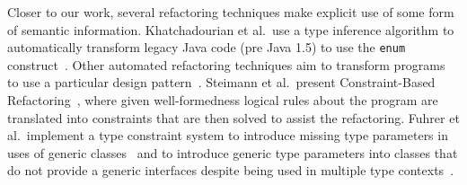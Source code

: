 \documentclass[sigconf,review,anonymous]{acmart}
\begin{document}
Closer to our work, several refactoring techniques make explicit use of some
form of semantic information.
%
%
Khatchadourian et al.~use a type inference algorithm to automatically
transform legacy Java code (pre Java 1.5) to use the \lstinline[breaklines=true]{enum}
construct~\cite{sawin}.
%
%
Other automated refactoring techniques aim to transform programs to use a
particular design pattern~\cite{chris,bae}.
%
%
%
%
%
Steimann et al.~present Constraint-Based
Refactoring~\cite{Steimann2011,Steimann2012Pilgrim,Steimann2011KollePilgrim},
where given well-formedness logical rules about the program are translated
into constraints that are then solved to assist the refactoring.
%
%
Fuhrer et al.~implement a type constraint system to introduce missing type
parameters in uses of generic classes~\cite{DBLP:conf/ecoop/FuhrerTKDK05}
and to introduce generic type parameters into classes that do not provide a
generic interfaces despite being used in multiple type
contexts~\cite{DBLP:conf/icse/KiezunETF07}.
%
%
\end{document}
